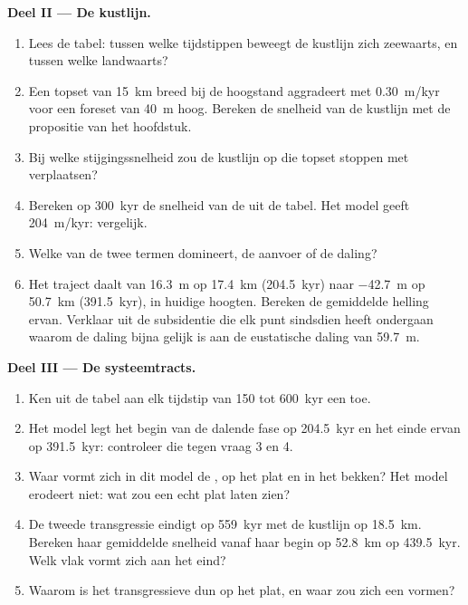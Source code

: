 \begin{problem}
\medskip\noindent\textbf{Deel II --- De kustlijn.}
\begin{enumerate}[resume]
\item Lees de tabel: tussen welke tijdstippen beweegt de kustlijn zich zeewaarts,
  en tussen welke landwaarts?
\item Een topset van \qty{15}{km} breed bij de hoogstand aggradeert met \qty{0.30}{m/kyr}
  voor een foreset van \qty{40}{m} hoog. Bereken de snelheid van de
  kustlijn met de propositie van het hoofdstuk.
\item Bij welke stijgingssnelheid zou de kustlijn op die topset stoppen met verplaatsen?
\item Bereken op \qty{300}{kyr} de snelheid van de 
  uit de tabel. Het model geeft \qty{204}{m/kyr}: vergelijk.
\item Welke van de twee termen domineert, de aanvoer of de daling?
\item Het traject daalt van \qty{16.3}{m} op \qty{17.4}{km}
  (\qty{204.5}{kyr}) naar \qty{-42.7}{m} op \qty{50.7}{km}
  (\qty{391.5}{kyr}), in huidige hoogten. Bereken de gemiddelde helling ervan.
  Verklaar uit de subsidentie die elk punt sindsdien heeft ondergaan waarom de daling
  bijna gelijk is aan de eustatische daling van \qty{59.7}{m}.
\end{enumerate}

\medskip\noindent\textbf{Deel III --- De systeemtracts.}
\begin{enumerate}[resume]
\item Ken uit de tabel aan elk tijdstip van 150 tot
  \qty{600}{kyr} een  toe.
\item Het model legt het begin van de dalende fase op \qty{204.5}{kyr}
  en het einde ervan op \qty{391.5}{kyr}: controleer die tegen vraag 3 en 4.
\item Waar vormt zich in dit model de , op het plat en in het bekken?
  Het model erodeert niet: wat zou een echt plat laten zien?
\item De tweede transgressie eindigt op \qty{559}{kyr} met de kustlijn op
  \qty{18.5}{km}. Bereken haar gemiddelde snelheid vanaf haar begin op \qty{52.8}{km} op
  \qty{439.5}{kyr}. Welk vlak vormt zich aan het eind?
\item Waarom is het transgressieve  dun op het plat, en waar zou zich
  een  vormen?
\end{enumerate}


\end{problem}
